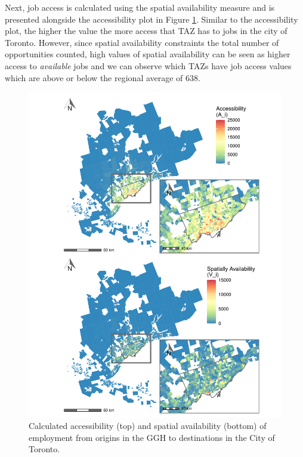 \documentclass[]{elsarticle} %
\begin{document}
Next, job access is calculated using the spatial availability measure
and is presented alongside the accessibility plot in Figure
\ref{fig:plot-access-SA-Toronto-TTS}. Similar to the accessibility plot,
the higher the value the more access that TAZ has to jobs in the city of
Toronto. However, since spatial availability constraints the total
number of opportunities counted, high values of spatial availability can
be seen as higher access to \emph{available} jobs and we can observe
which TAZs have job access values which are above or below the regional
average of 638.

\begin{figure}
\includegraphics[width=1\linewidth]{Spatial-Availability_files/figure-latex/plot-access-SA-Toronto-TTS-1} \caption{\label{fig:plot-access-SA-Toronto-TTS}Calculated accessibility (top) and spatial availability (bottom) of employment from origins in the GGH to destinations in the City of Toronto.}\label{fig:plot-access-SA-Toronto-TTS}
\end{figure}
\end{document}
